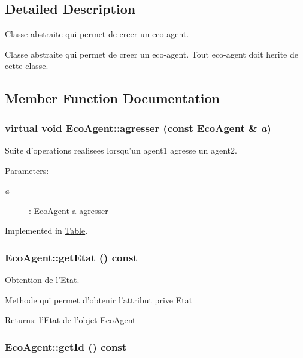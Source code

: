\subsection{Detailed Description}
Classe abstraite qui permet de creer un eco-agent. 

Classe abstraite qui permet de creer un eco-agent. Tout eco-agent doit herite de cette classe. 

\subsection{Member Function Documentation}
\hypertarget{classEcoAgent_5d7e837b4a3a6b73fc1fb60c5fddefa5}{
\subsubsection[{agresser}]{\setlength{\rightskip}{0pt plus 5cm}virtual void EcoAgent::agresser (const {\bf EcoAgent} \& {\em a})}}
\label{classEcoAgent_5d7e837b4a3a6b73fc1fb60c5fddefa5}


Suite d'operations realisees lorsqu'un agent1 agresse un agent2. 

\begin{Desc}
\item[Parameters:]
\begin{description}
\item[{\em a}]: \hyperlink{classEcoAgent}{EcoAgent} a agresser \end{description}
\end{Desc}


Implemented in \hyperlink{classTable_1aac4abcbb55e193e23a2e547c232273}{Table}.\hypertarget{classEcoAgent_91160732f8c4dd585ac5d8ad69bf3891}{
\subsubsection[{getEtat}]{ EcoAgent::getEtat () const}}
\label{classEcoAgent_91160732f8c4dd585ac5d8ad69bf3891}


Obtention de l'Etat. 

Methode qui permet d'obtenir l'attribut prive Etat

\begin{Desc}
\item[Returns:]l'Etat de l'objet \hyperlink{classEcoAgent}{EcoAgent} \end{Desc}
\hypertarget{classEcoAgent_9584d21ca52b786efc1b988a65683274}{
\subsubsection[{getId}]{ EcoAgent::getId () const}}
\label{classEcoAgent_9584d21ca52b786efc1b988a65683274}


